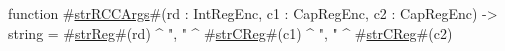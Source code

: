 function #\hyperref[sailMIPSzstrRCCArgs]{strRCCArgs}#(rd : IntRegEnc, c1 : CapRegEnc, c2 : CapRegEnc) -> string = #\hyperref[sailMIPSzstrReg]{strReg}#(rd) ^ ", " ^ #\hyperref[sailMIPSzstrCReg]{strCReg}#(c1) ^ ", " ^ #\hyperref[sailMIPSzstrCReg]{strCReg}#(c2)
